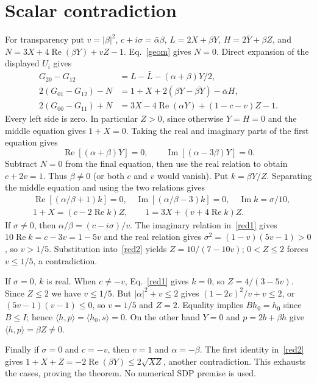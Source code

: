 \documentclass[11pt]{article}
\begin{document}
\section{Scalar contradiction}
For transparency put $v=|\beta|^2$, $c+i\sigma=\bar\alpha\beta$, $L=2X+\beta Y$, $H=2\bar Y+\beta Z$, and $N=3X+4\operatorname{Re}(\beta Y)+vZ-1$. Eq.~\eqref{geom} gives $N=0$. Direct expansion of the displayed $U_i$ gives
\begin{align*}
 G_{20}-G_{12}&=L-\bar L-(\alpha+\beta)Y/2,\\
 2(G_{01}-G_{12})-N&=1+X+2(\beta Y-\overline{\beta Y})-\bar\alpha H,\\
 2(G_{00}-G_{11})+N&=3X-4\operatorname{Re}(\alpha Y)+(1-c-v)Z-1 .
\end{align*}
Every left side is zero. In particular $Z>0$, since otherwise $Y=H=0$ and the middle equation gives $1+X=0$. Taking the real and imaginary parts of the first equation gives
\[
  \operatorname{Re}[(\alpha+\beta)Y]=0,\qquad
  \operatorname{Im}[(\alpha-3\beta)Y]=0.
\]
Subtract $N=0$ from the final equation, then use the real relation to obtain $c+2v=1$. Thus $\beta\ne0$ (or both $c$ and $v$ would vanish). Put $k=\beta Y/Z$. Separating the middle equation and using the two relations gives
\begin{align}
 &\operatorname{Re}[(\alpha/\beta+1)k]=0,\quad
   \operatorname{Im}[(\alpha/\beta-3)k]=0,\quad
   \operatorname{Im}k=\sigma/10,\label{red1}\\
 &1+X=(c-2\operatorname{Re}k)Z,\qquad
   1=3X+(v+4\operatorname{Re}k)Z .\label{red2}
\end{align}
If $\sigma\ne0$, then $\alpha/\beta=(c-i\sigma)/v$. The imaginary relation in~\eqref{red1} gives $10\operatorname{Re}k=c-3v=1-5v$ and the real relation gives $\sigma^2=(1-v)(5v-1)>0$, so $v>1/5$. Substitution into~\eqref{red2} yields $Z=10/(7-10v)$; $0<Z\le2$ forces $v\le1/5$, a contradiction.

If $\sigma=0$, $k$ is real. When $c\ne-v$, Eq.~\eqref{red1} gives $k=0$, so $Z=4/(3-5v)$. Since $Z\le2$ we have $v\le1/5$. But $|\alpha|^2+v\le2$ gives $(1-2v)^2/v+v\le2$, or $(5v-1)(v-1)\le0$, so $v=1/5$ and $Z=2$. Equality implies $Bh_0=h_0$ since $B\le I$; hence $\langle h,p\rangle=\langle h_0,s\rangle=0$. On the other hand $Y=0$ and $p=2b+\beta h$ give $\langle h,p\rangle=\beta Z\ne0$.

Finally if $\sigma=0$ and $c=-v$, then $v=1$ and $\alpha=-\beta$. The first identity in~\eqref{red2} gives $1+X+Z=-2\operatorname{Re}(\beta Y)\le2\sqrt{XZ}$, another contradiction. This exhausts the cases, proving the theorem. No numerical SDP premise is used.
\end{document}
